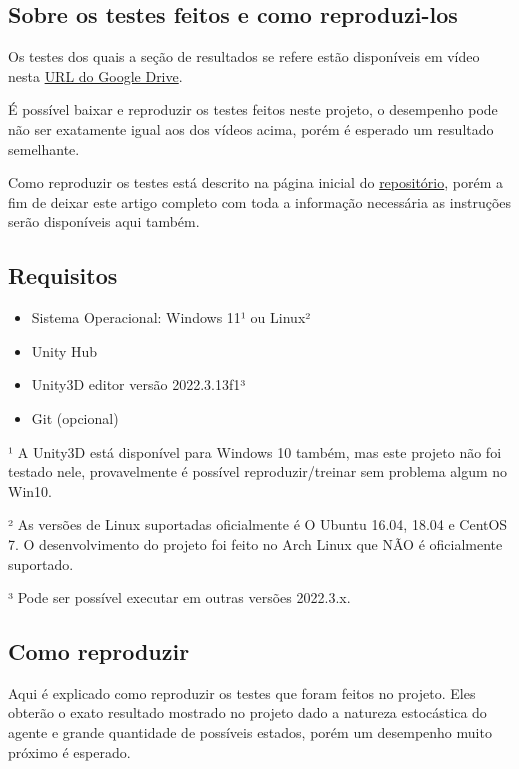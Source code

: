 \begin{apendicesenv}

\partapendices

\chapter{Sobre os testes feitos e como reproduzi-los}

Os testes dos quais a seção de resultados se refere estão disponíveis em vídeo nesta \href{https://drive.google.com/drive/folders/1WcdHMeFQLfDubvYvLJnqbobnysT5pJoq?usp=sharing}{URL do Google Drive}.

É possível baixar e reproduzir os testes feitos neste projeto, o desempenho pode não ser exatamente igual aos dos vídeos acima, porém é esperado um resultado semelhante.

Como reproduzir os testes está descrito na página inicial do \href{https://github.com/antunesvitor/SimuladorDeConducao}{repositório}, porém a fim de deixar este artigo completo com toda a informação necessária as instruções serão disponíveis aqui também.

\section*{Requisitos}

\begin{itemize}
    \item Sistema Operacional: Windows 11¹  ou Linux²
    \item Unity Hub
    \item Unity3D editor versão 2022.3.13f1³
    \item Git (opcional)
\end{itemize}

¹ A Unity3D está disponível para Windows 10 também, mas este projeto não foi testado nele, provavelmente é possível reproduzir/treinar sem problema algum no Win10.

² As versões de Linux suportadas oficialmente é O Ubuntu 16.04, 18.04 e CentOS 7.  O desenvolvimento do projeto foi feito no Arch Linux que NÃO é oficialmente suportado.

³ Pode ser possível executar em outras versões 2022.3.x.

\section*{Como reproduzir} 
Aqui é explicado como reproduzir os testes que foram feitos no projeto. Eles obterão o exato resultado mostrado no projeto dado a natureza estocástica do agente e grande quantidade de possíveis estados, porém um desempenho muito próximo é esperado.


\end{apendicesenv}

